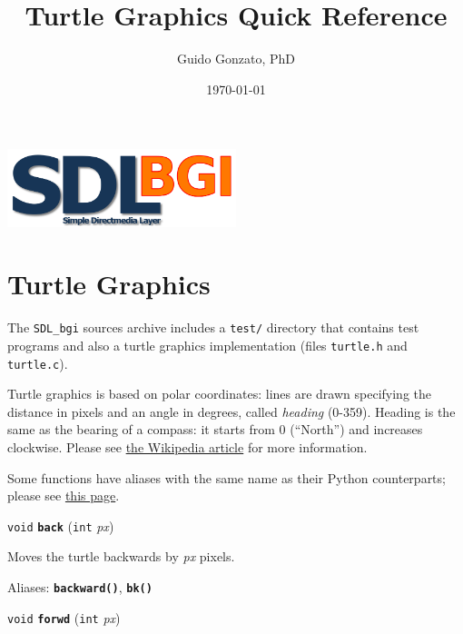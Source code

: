 \documentclass[a4paper,11pt]{article}
\newcommand{\SDLbgi}{\texttt{SDL\_bgi}}
\newcommand{\V}{\texttt{void}}      %
\newcommand{\I}{\texttt{int}}       %
\newcommand{\func}[1]{\textbf{\texttt{#1}}}  %
\newcommand{\A}[1]{\emph{#1}}       %
\newcommand{\file}[1]{\texttt{#1}}
\newenvironment{bgi}
{ %
  \begin{snugshade}
}
{ %
  \end{snugshade}
}
\begin{document}
\title{Turtle Graphics Quick Reference}

\author{Guido Gonzato, PhD}

\date{\today}

\maketitle

\begin{center}
  \includegraphics[width=0.5\textwidth]{SDL_bgi_logo.png}  
\end{center}


\section{Turtle Graphics}

The \SDLbgi{} sources archive includes a \file{test/} directory that
contains test programs and also a turtle graphics implementation
(files \file{turtle.h} and \file{turtle.c}).

Turtle graphics is based on polar coordinates: lines are drawn
specifying the distance in pixels and an angle in degrees, called
\emph{heading} (0-359). Heading is the same as the bearing of a
compass: it starts from 0 (``North'') and increases clockwise. Please
see \href{https://en.wikipedia.org/wiki/Turtle_graphics}{the Wikipedia
article} for more information.

Some functions have aliases with the same name as their Python
counterparts; please see
\href{https://docs.python.org/3/library/turtle.html}{this page}.


\begin{bgi}
\V{} \func{back} (\I{} \A{px})
\end{bgi}

Moves the turtle backwards by \A{px} pixels.

Aliases: \func{backward()}, \func{bk()}


\begin{bgi}
\V{} \func{forwd} (\I{} \A{px})
\end{bgi}
\end{document}
